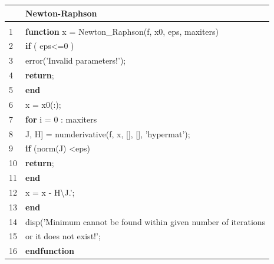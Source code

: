 \documentclass[bosnian,12pt,a4paper]{report}
\begin{document}
\begin{tabular}{ll}
   & Newton-Raphson                                                \\ \hline \\
1  & \textbf{function} x = Newton\_Raphson(f, x0, eps, maxiters)            \\
2  & \hspace*{1cm}\textbf{if} ( eps\textless{}=0 )                                       \\
3  & \hspace*{2cm}error('Invalid parameters!');                               \\
4  & \hspace*{2cm}\textbf{return};                                                       \\
5  & \hspace*{1cm}\textbf{end} 
\\
6  & \hspace*{1cm}x = x0(:);                                                       \\
7  & \hspace*{1cm}\textbf{for} i = 0 : maxiters                                          \\
8  & \hspace*{2cm}{[}J, H{]} = numderivative(f, x, {[}{]}, {[}{]}, 'hypermat'); \\
9 & \hspace*{2cm}\textbf{if} (norm(J) \textless eps)                                    \\
10 & \hspace*{3cm}\textbf{return};                                                       \\
11 & \hspace*{2cm}\textbf{end                                                          } \\
12 & \hspace*{2cm}x = x - H\textbackslash{}J.';                                 \\
13 & \hspace*{1cm}\textbf{end                                                          } \\
14 & \hspace*{1cm}disp('Minimum cannot be found within given number of iterations                                                          \\
15 & \hspace*{2cm}or it does not exist!'; 
\\
16 & \textbf{endfunction                                                  } \\ \hline
\end{tabular}
\end{document}
